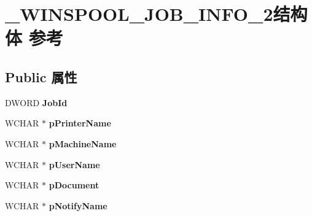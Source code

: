 \hypertarget{struct___w_i_n_s_p_o_o_l___j_o_b___i_n_f_o__2}{}\section{\+\_\+\+W\+I\+N\+S\+P\+O\+O\+L\+\_\+\+J\+O\+B\+\_\+\+I\+N\+F\+O\+\_\+2结构体 参考}
\label{struct___w_i_n_s_p_o_o_l___j_o_b___i_n_f_o__2}
\subsection*{Public 属性}
\begin{DoxyCompactItemize}
\item 
\mbox{\label{struct___w_i_n_s_p_o_o_l___j_o_b___i_n_f_o__2_a8f9de5d36bee0136776cf7020a7de990}} 
D\+W\+O\+RD {\bfseries Job\+Id}
\item 
\mbox{\label{struct___w_i_n_s_p_o_o_l___j_o_b___i_n_f_o__2_a0152fc8bfab8156cf9701681320725ad}} 
W\+C\+H\+AR $\ast$ {\bfseries p\+Printer\+Name}
\item 
\mbox{\label{struct___w_i_n_s_p_o_o_l___j_o_b___i_n_f_o__2_a7d6faee305ae4e387dcaa9bcab331690}} 
W\+C\+H\+AR $\ast$ {\bfseries p\+Machine\+Name}
\item 
\mbox{\label{struct___w_i_n_s_p_o_o_l___j_o_b___i_n_f_o__2_a0a74a4379d72d96c2316594928384709}} 
W\+C\+H\+AR $\ast$ {\bfseries p\+User\+Name}
\item 
\mbox{\label{struct___w_i_n_s_p_o_o_l___j_o_b___i_n_f_o__2_ab03f63ccf4fd97617ad3aecde9cefc96}} 
W\+C\+H\+AR $\ast$ {\bfseries p\+Document}
\item 
\mbox{\label{struct___w_i_n_s_p_o_o_l___j_o_b___i_n_f_o__2_a53e3f518d772899e40412b8e4c450f33}} 
W\+C\+H\+AR $\ast$ {\bfseries p\+Notify\+Name}
\item 
\mbox{\label{struct___w_i_n_s_p_o_o_l___j_o_b___i_n_f_o__2_aba3214e4cc052b45022253a200257394}} 

\end{DoxyCompactItemize}
